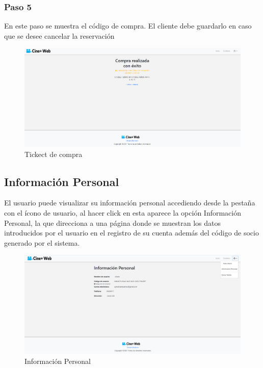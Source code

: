 \subsubsection{Paso 5}
En este paso se muestra el c\'odigo de compra. El cliente debe guardarlo en caso que se desee cancelar la reservaci\'on

\begin{figure}[h!]
	\centering
	\includegraphics[scale=0.35]{./chapters/img/ticketpurchase3.png}
	
	\label{fig:ticketpurchase3}
	\caption{Tickect de compra}
	
\end{figure}

\subsection{Informaci\'on Personal}
El usuario puede visualizar su informaci\'on personal accediendo desde la pesta\~na con el \'icono de usuario, al hacer click en esta aparece la opci\'on Informaci\'on Personal, la que direcciona a una p\'agina donde se muestran los datos introducidos por el usuario en el registro de su cuenta adem\'as del c\'odigo de socio generado por el sistema.

\begin{figure}[h!]
	\centering
	\includegraphics[scale=0.35]{./chapters/img/personal_info.png}
	
	\label{fig:personal_info}
	\caption{Informaci\'on Personal}
	
\end{figure}